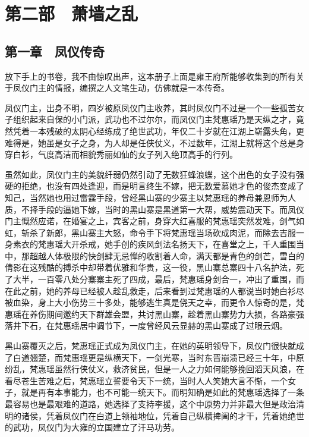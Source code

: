 \part{第二部　萧墙之乱}

\chapter{第一章　凤仪传奇}

放下手上的书卷，我不由惊叹出声，这本册子上面是雍王府所能够收集到的所有关于凤仪门主的情报，编撰之人文笔生动，仿佛就是一本传奇。

凤仪门主，出身不明，四岁被原凤仪门主收养，其时凤仪门不过是一个一些孤苦女子组织起来自保的小门派，武功也不过尔尔，而凤仪门主梵惠瑶乃是天纵之才，竟然凭着一本残破的太阴心经练成了绝世武功，年仅二十岁就在江湖上崭露头角，更难得是，她虽是女子之身，为人却是任侠仗义，不过数年，江湖上就将这个总是身穿白衫，气度高洁而相貌秀丽如仙的女子列入绝顶高手的行列。

虽然如此，凤仪门主的美貌纤弱仍然引动了无数狂蜂浪蝶，这个出色的女子没有强硬的拒绝，也没有四处逢迎，而是明言终生不嫁，把无数爱慕她才色的俊杰变成了知己，当然她也用过雷霆手段，曾经黑山寨的少寨主以梵惠瑶的养母兼恩师为人质，不择手段的逼她下嫁，当时的黑山寨是黑道第一大帮，威势震动天下。而凤仪门主慨然应诺，在婚宴之上，宾客之前，身穿大红喜服的梵惠瑶突然发难，剑气如虹，斩杀了新郎，黑山寨主大怒，命令手下将梵惠瑶当场砍成肉泥，而除去吉服一身素衣的梵惠瑶大开杀戒，她手创的疾风剑法名扬天下，在喜堂之上，千人重围当中，那超越人体极限的快剑肆无忌惮的收割着人命，满天都是青色的剑芒，雪白的倩影在这残酷的搏杀中却带着优雅和华贵，这一役，黑山寨总寨四十八名护法，死了大半，一百零八处分寨寨主死了四成，最后，梵惠瑶身剑合一，冲出了重围，而在此之前，她的养母已经被人趁乱救走，后来看到过梵惠瑶的人都说当时她白衫尽被血染，身上大小伤势三十多处，能够逃生真是侥天之幸，而更令人惊奇的是，梵惠瑶在养伤期间邀约天下群雄会盟，共讨黑山寨，趁着黑山寨势力大损，各路豪强落井下石，在梵惠瑶居中调节下，一度曾经风云显赫的黑山寨成了过眼云烟。

黑山寨覆灭之后，梵惠瑶正式成为凤仪门主，在她的英明领导下，凤仪门很快就成了白道翘楚，而梵惠瑶更是纵横天下，一剑光寒，当时东晋崩溃已经三十年，中原纷乱，梵惠瑶虽然行侠仗义，救济贫民，但是一人之力如何能够挽回滔天风浪，在看尽苍生苦难之后，梵惠瑶立誓要令天下一统，当时人人笑她大言不惭，一个女子，就是再有本事能力，也不可能一统天下。而明知确是如此的梵惠瑶选择了一条最容易也是最艰难的道路，她选择了支持李援，这个中原势力并非最大但是政治清明的诸侯，凭着凤仪门在白道上领袖地位，凭着自己纵横捭阖的才干，凭着她绝世的武功，凤仪门为大雍的立国建立了汗马功劳。

